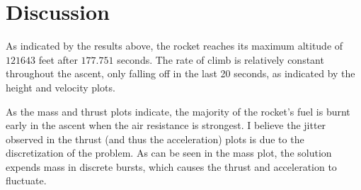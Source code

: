 \documentclass{article}
\begin{document}
\section{Discussion}\label{Discussion}

As indicated by the results above, the rocket reaches its maximum altitude of \(121643\) feet after \(177.751\) seconds. The rate of climb is relatively constant throughout the ascent, only falling off in the last 20 seconds, as indicated by the height and velocity plots.

As the mass and thrust plots indicate, the majority of the rocket's fuel is burnt early in the ascent when the air resistance is strongest. I believe the jitter observed in the thrust (and thus the acceleration) plots is due to the discretization of the problem. As can be seen in the mass plot, the solution expends mass in discrete bursts, which causes the thrust and acceleration to fluctuate.
\end{document}
